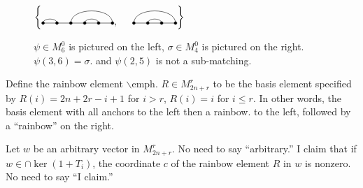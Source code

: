 \documentclass{amsart}
\begin{document}
\begin{figure} 
	\def\cbasisspacing{5mm}
	$\cbr{
		\begin{gathered}
		\Matching{6}{1/2, 3/6, 4/5}, \hspace{\cbasisspacing}
		\Matching{4}{1/4, 2/3}
		\end{gathered}}$
	\caption{$\psi\in M_6^0$ is pictured on the left, $\sigma\in M_4^0$ is pictured on the right. $\psi(3,6)=\sigma$. 
    {\color{magenta} and }
  $\psi(2,5)$ is not a sub-matching.}
	\label{sub-matching example}
\end{figure}

Define the rainbow element 
{\color{magenta} $\backslash$emph.} 
$R\in M_{2n+r}^r$ to be the basis element specified by $R(i)=2n+2r-i+1$ for $i>r$, $R(i)=i$ for $i\leq r$. In other words, the basis element with all anchors to the left then a rainbow.
{\color{magenta} to the left, followed by a ``rainbow'' on the right.}

\begin{proposition}
  Let $w$ be an arbitrary vector in $M_{2n+r}^r$.
  {\color{magenta} No need to say ``arbitrary.''} 
  I claim that if $w\in \cap\ker(1+T_i)$, the coordinate $c$ of the rainbow element $R$ in $w$ is nonzero. 
  {\color{magenta} No need to say ``I claim.''}
	\label{rainbow nonzero}
\end{proposition}	
\end{document}
